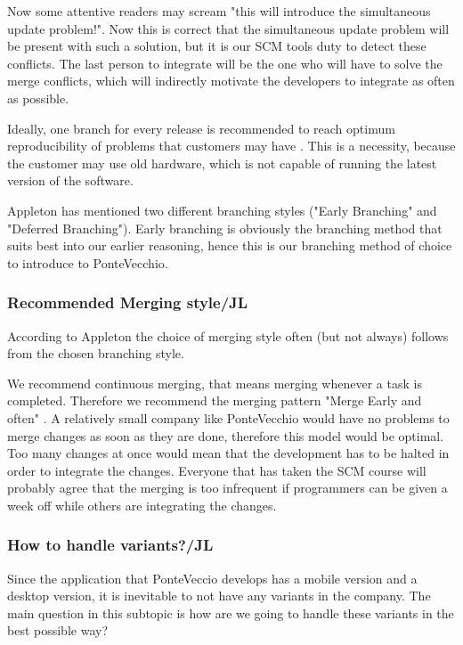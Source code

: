 \documentclass[10pt]{article}
\begin{document}
\noindent Now some attentive readers may scream "this will introduce the simultaneous update problem!"\cite{Babich}. Now this is correct that the simultaneous update problem will be present with such a solution, but it is our SCM tools duty to detect these conflicts. The last person to integrate will be the one who will have to solve the merge conflicts, which will indirectly motivate the developers to integrate as often as possible.

\noindent Ideally, one branch for every release is recommended to reach optimum reproducibility of problems that customers may have \cite{Vance}. This is a necessity, because the customer may use old hardware, which is not capable of running the latest version of the software.

\noindent Appleton \cite{Appleton} has mentioned two different branching styles ("Early Branching" and "Deferred Branching"). Early branching is obviously the branching method that suits best into our earlier reasoning, hence this is our branching method of choice to introduce to PonteVecchio. 

\subsubsection{Recommended Merging style/JL}
\noindent According to Appleton \cite{Appleton} the choice of merging style often (but not always) follows from the chosen branching style.

\noindent We recommend continuous merging, that means merging whenever a task is completed. Therefore we recommend the merging pattern "Merge Early and often" \cite{Appleton}. A relatively small company like PonteVecchio would have no problems to merge changes as soon as they are done, therefore this model would be optimal. Too many changes at once would mean that the development has to be halted in order to integrate the changes. Everyone that has taken the SCM course will probably agree that the merging is too infrequent if programmers can be given a week off while others are integrating the changes.

\subsubsection{How to handle variants?/JL}
Since the application that PonteVeccio develops has a mobile version and a desktop version, it is inevitable to not have any variants in the company. The main question in this subtopic is how are we going to handle these variants in the best possible way?
\end{document}
